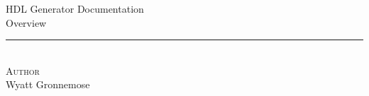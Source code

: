 \documentclass[12pt,letterpaper,oneside]{article}
\renewcommand{\thesubsection}{3}
\newcommand{\HRule}{\rule{\linewidth}{0.5mm}}
\begin{document}
\begin{titlepage}
\begin{center}
{\LARGE HDL Generator Documentation\\[1cm]}
{\LARGE Overview\\[1cm]}

\HRule \\[1.0cm]
{\LARGE \textsc{Author}\\[0.1cm]}
{\LARGE Wyatt Gronnemose\\[0.2cm]}

\thispagestyle{empty} %
\clearpage
\end{center}
\end{titlepage}

\setcounter{page}{2}

\newpage
\singlespacing

\setcounter{tocdepth}{3}
\setcounter{secnumdepth}{3}

\tableofcontents
\listoffigures
\newpage

\flushleft

\setcounter{section}{0}
\setcounter{subsection}{0}
\setcounter{subsubsection}{0}

\renewcommand{\thesection}{\arabic{section}}

\renewcommand{\thesubsection}{\arabic{section}.\arabic{subsection}}

\renewcommand{\thesubsubsection}{\arabic{section}.\arabic{subsection}.\arabic{subsubsection}}



\end{document}
